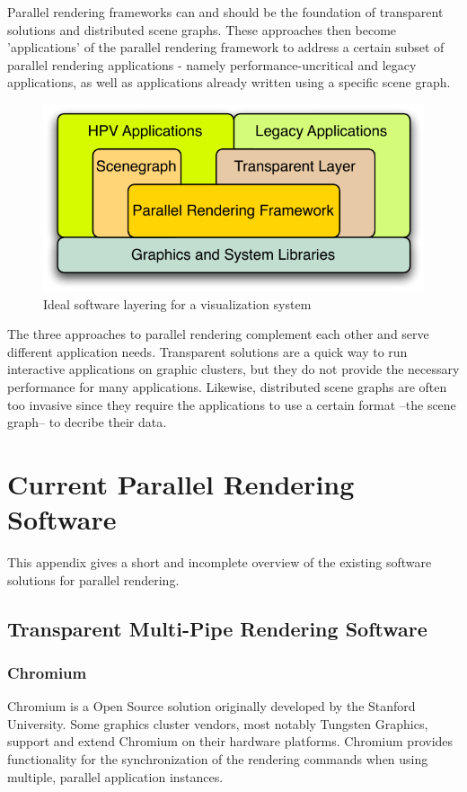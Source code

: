 \documentclass[10pt,a4paper]{scrartcl}
\begin{document}
Parallel rendering frameworks can and should be the foundation of
transparent solutions and distributed scene graphs. These approaches
then become 'applications' of the parallel rendering framework to
address a certain subset of parallel rendering applications - namely
performance-uncritical and legacy applications, as well as applications
already written using a specific scene graph.

\begin{figure}[ht]
\centering
\includegraphics[width=0.45\columnwidth]{images/layers.pdf}
\caption{Ideal software layering for a visualization system}
\label{FIG_parallel}
\end{figure}

The three approaches to parallel rendering complement each other and
serve different application needs. Transparent solutions are a quick way
to run interactive applications on graphic clusters, but they do not
provide the necessary performance for many applications. Likewise,
distributed scene graphs are often too invasive since they require the
applications to use a certain format --the scene graph-- to decribe their
data. 

\appendix
\section{Current Parallel Rendering Software}
This appendix gives a short and incomplete overview of the existing
software solutions for parallel rendering.

\subsection{Transparent Multi-Pipe Rendering Software}
\subsubsection{Chromium}
Chromium is a Open Source solution originally developed by the
Stanford University. Some graphics cluster vendors, most notably
Tungsten Graphics, support and extend Chromium on their hardware
platforms. Chromium provides functionality for the synchronization
of the rendering commands when using multiple, parallel application
instances.
\end{document}
